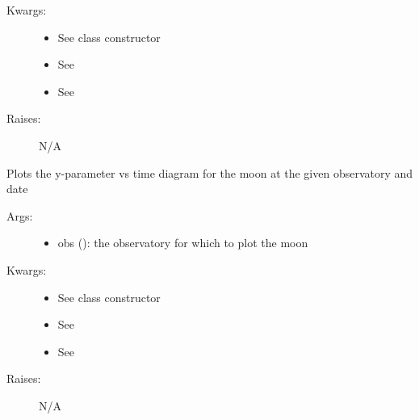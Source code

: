 \documentclass[letterpaper,10pt,english]{sphinxmanual}
\begin{document}
\begin{fulllineitems}
\begin{fulllineitems}
\begin{description}
\begin{itemize}
\end{itemize}

\item[{Kwargs:}] \leavevmode\begin{itemize}
\item {} 
See class constructor

\item {} 
See 

\item {} 
See 

\end{itemize}

\item[{Raises:}] \leavevmode
N/A

\end{description}

\end{fulllineitems}


\begin{fulllineitems}
\label{astroobs:astroobs.Moon.polar}
Plots the y-parameter vs time diagram for the moon at the given observatory and date
\begin{description}
\item[{Args:}] \leavevmode\begin{itemize}
\item {} 
obs (): the observatory for which to plot the moon

\end{itemize}

\item[{Kwargs:}] \leavevmode\begin{itemize}
\item {} 
See class constructor

\item {} 
See 

\item {} 
See 

\end{itemize}

\item[{Raises:}] \leavevmode
N/A

\end{description}

\end{fulllineitems}


\end{fulllineitems}
\end{document}
